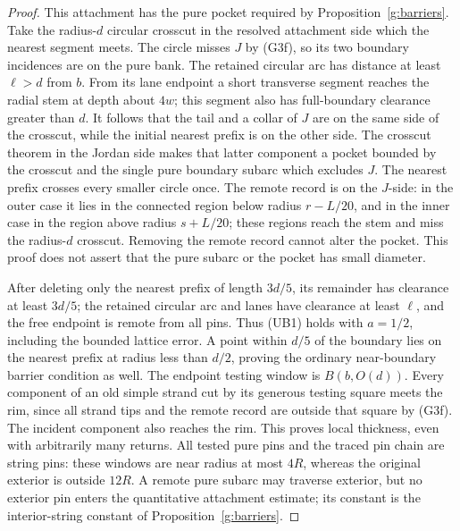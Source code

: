 \begin{proof}
This attachment has the pure pocket required by Proposition~\ref{g:barriers}.
Take the radius-\(d\) circular crosscut in the resolved attachment side which
the nearest segment meets.  The circle misses \(J\) by (G3f), so its
two boundary incidences are on the pure bank.  The retained circular arc
has distance at least \(\ell>d\) from \(b\).  From its lane endpoint a
short transverse segment reaches the radial stem at depth about \(4w\);
this segment also has full-boundary clearance greater than \(d\).
It follows that the tail and a collar of \(J\) are on the same side of
the crosscut, while the initial nearest prefix is on the other side.
The crosscut theorem in the Jordan side makes that latter component a
pocket bounded by the crosscut and the single pure boundary subarc which
excludes \(J\).  The nearest prefix crosses every smaller circle once.
The remote record is on the \(J\)-side: in the outer case it lies in
the connected region below radius \(r-L/20\), and in the inner case
in the region above radius \(s+L/20\); these regions reach the stem and
miss the radius-\(d\) crosscut.  Removing the remote record cannot
alter the pocket.  This proof does not assert that the pure subarc or
the pocket has small diameter.

After deleting only the nearest prefix of length \(3d/5\), its remainder
has clearance at least \(3d/5\); the retained circular arc and lanes
have clearance at least \(\ell\), and the free endpoint is remote from
all pins.  Thus (UB1) holds with \(a=1/2\), including the bounded lattice
error.  A point within \(d/5\) of the boundary lies on the nearest prefix
at radius less than \(d/2\), proving the ordinary near-boundary barrier
condition as well.  The endpoint testing window is \(B(b,O(d))\).
Every component of an old simple strand cut by its generous testing
square meets the rim, since all strand tips and the remote record are
outside that square by (G3f).  The incident component also reaches the
rim.  This proves local thickness, even with arbitrarily many returns.
All tested pure pins and the traced pin chain are string pins: these
windows are near radius at most \(4R\), whereas the original exterior
is outside \(12R\).  A remote pure subarc may traverse exterior, but
no exterior pin enters the quantitative attachment estimate; its constant
is the interior-string constant of Proposition~\ref{g:barriers}.


\end{proof}
